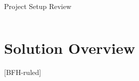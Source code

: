 \documentclass[
ngerman,%
authorontitle=true,
]{bfhbeamer}
\begin{document}
\begin{frame}{Project Setup Review}
\begin{columns}
\begin{column}{0.23\textwidth}
\begin{center}
				\end{center}
			\end{column}
		\end{columns}
	\end{frame}
	
	
	
	\section{Solution Overview}
	[BFH-ruled]
	\frame{\sectionpage}
	
\end{document}
